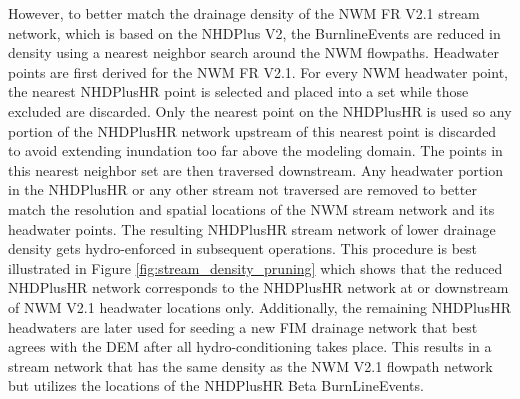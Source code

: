 However, to better match the drainage density of the NWM FR V2.1 stream network, which is based on the NHDPlus V2, the BurnlineEvents are reduced in density using a nearest neighbor search around the NWM flowpaths.
Headwater points are first derived for the NWM FR V2.1.
For every NWM headwater point, the nearest NHDPlusHR point is selected and placed into a set while those excluded are discarded.
Only the nearest point on the NHDPlusHR is used so any portion of the NHDPlusHR network upstream of this nearest point is discarded to avoid extending inundation too far above the modeling domain.
The points in this nearest neighbor set are then traversed downstream.
Any headwater portion in the NHDPlusHR or any other stream not traversed are removed to better match the resolution and spatial locations of the NWM stream network and its headwater points.
The resulting NHDPlusHR stream network of lower drainage density gets hydro-enforced in subsequent operations.
This procedure is best illustrated in Figure \ref{fig:stream_density_pruning} which shows that the reduced NHDPlusHR network corresponds to the NHDPlusHR network at or downstream of NWM V2.1 headwater locations only. 
Additionally, the remaining NHDPlusHR headwaters are later used for seeding a new FIM drainage network that best agrees with the DEM after all hydro-conditioning takes place.
This results in a stream network that has the same density as the NWM V2.1 flowpath network but utilizes the locations of the NHDPlusHR Beta BurnLineEvents. 
%
